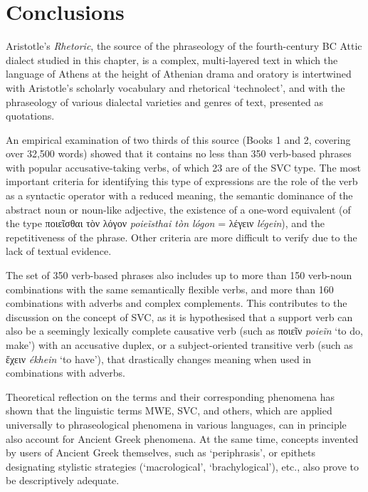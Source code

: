 \documentclass[output=paper,colorlinks,citecolor=brown]{langscibook}
\begin{document}
\section{Conclusions}

Aristotle’s \textit{Rhetoric}, the source of the phraseology of the fourth-century BC Attic dialect studied in this chapter, is a complex, multi-layered text in which the language of Athens at the height of Athenian drama and oratory is intertwined with Aristotle’s scholarly vocabulary and rhetorical ‘technolect’, and with the phraseology of various dialectal varieties and genres of text, presented as quotations.

An empirical examination of two thirds of this source (Books 1 and 2, covering over 32,500 words) showed that it contains no less than 350 verb-based phrases with popular accusative-taking verbs, of which 23 are of the SVC type. The most important criteria for identifying this type of expressions are the role of the verb as a syntactic operator with a reduced meaning, the semantic dominance of the abstract noun or noun-like adjective, the existence of a one-word equivalent (of the type ποιεῖσθαι τὸν λόγον \textit{poieĩsthai tòn lógon} = λέγειν \textit{légein}), and the repetitiveness of the phrase. Other criteria are more difficult to verify due to the lack of textual evidence.

The set of 350 verb-based phrases also includes up to more than 150 verb-noun combinations with the same semantically flexible verbs, and more than 160 combinations with adverbs and complex complements. This contributes to the discussion on the concept of SVC, as it is hypothesised that a support verb can also be a seemingly lexically complete causative verb (such as ποιεῖν \textit{poieĩn} ‘to do, make') with an accusative duplex, or a subject-oriented transitive verb (such as ἔχειν \textit{ékhein} ‘to have'), that drastically changes meaning when used in combinations with adverbs.

Theoretical reflection on the terms and their corresponding phenomena has shown that the linguistic terms MWE, SVC, and others, which are applied universally to phraseological phenomena in various languages, can in principle also account for Ancient Greek phenomena. At the same time, concepts invented by users of Ancient Greek themselves, such as ‘periphrasis’, or epithets designating stylistic strategies (‘macrological’, ‘brachylogical’), etc., also prove to be descriptively adequate.
\end{document}
